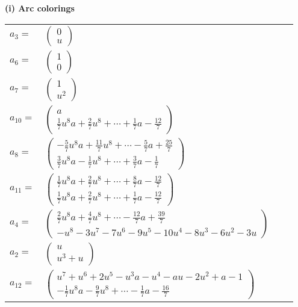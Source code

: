 \documentclass[1p]{elsarticle_modified}
\theoremstyle{definition}
\begin{document}
\flushleft \textbf{(i) Arc colorings}\\
\begin{tabular}{m{7pt} m{180pt} m{7pt} m{180pt} }
\flushright $a_{3}=$&$\begin{pmatrix}0\\u\end{pmatrix}$ \\
\flushright $a_{6}=$&$\begin{pmatrix}1\\0\end{pmatrix}$ \\
\flushright $a_{7}=$&$\begin{pmatrix}1\\u^2\end{pmatrix}$ \\
\flushright $a_{10}=$&$\begin{pmatrix}a\\\frac{1}{7} u^8 a+\frac{2}{7} u^8+\cdots+\frac{1}{7} a-\frac{12}{7}\end{pmatrix}$ \\
\flushright $a_{8}=$&$\begin{pmatrix}-\frac{5}{7} u^8 a+\frac{11}{7} u^8+\cdots-\frac{5}{7} a+\frac{25}{7}\\\frac{3}{7} u^8 a-\frac{1}{7} u^8+\cdots+\frac{3}{7} a-\frac{1}{7}\end{pmatrix}$ \\
\flushright $a_{11}=$&$\begin{pmatrix}\frac{1}{7} u^8 a+\frac{2}{7} u^8+\cdots+\frac{8}{7} a-\frac{12}{7}\\\frac{1}{7} u^8 a+\frac{2}{7} u^8+\cdots+\frac{1}{7} a-\frac{12}{7}\end{pmatrix}$ \\
\flushright $a_{4}=$&$\begin{pmatrix}\frac{2}{7} u^8 a+\frac{4}{7} u^8+\cdots-\frac{12}{7} a+\frac{39}{7}\\- u^8-3 u^7-7 u^6-9 u^5-10 u^4-8 u^3-6 u^2-3 u\end{pmatrix}$ \\
\flushright $a_{2}=$&$\begin{pmatrix}u\\u^3+u\end{pmatrix}$ \\
\flushright $a_{12}=$&$\begin{pmatrix}u^7+u^6+2 u^5- u^3 a- u^4- a u-2 u^2+a-1\\-\frac{1}{7} u^8 a-\frac{9}{7} u^8+\cdots-\frac{1}{7} a-\frac{16}{7}\end{pmatrix}$ \\

\end{tabular}
\end{document}
